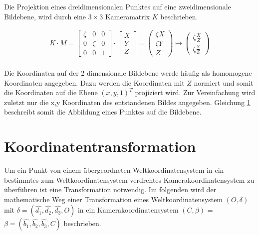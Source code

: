 Die Projektion eines dreidimensionalen Punktes auf eine zweidimensionale Bildebene, wird durch eine $3 \times 3$ Kameramatrix $K$ beschrieben. 

\begin{gather}
K\cdot M =
\begin{bmatrix}
\zeta&0&0\\
0&\zeta&0\\
0&0&1
\end{bmatrix}
\cdot
\begin{bmatrix}
X\\Y\\Z
\end{bmatrix}
=
\begin{pmatrix}
\zeta X\\ \zeta Y\\ Z
\end{pmatrix}
\mapsto
\begin{pmatrix}
\zeta \frac{X}{Z}\\ \zeta \frac{Y}{Z}
\end{pmatrix}
	\label{eq:21}
\end{gather}\\

Die Koordinaten auf der 2 dimensionale Bildebene werde häufig als homomogene Koordinaten angegeben. Dazu werden die Koordinaten mit $Z$ normiert und somit die Koordinaten auf die Ebene $(x,y,1)^T$ projiziert wird. Zur Vereinfachung wird zuletzt nur die x,y Koordinaten des entstandenen Bildes angegeben. Gleichung \ref{} beschreibt somit die Abbildung eines Punktes auf die Bildebene.

\section{Koordinatentransformation}

Um ein Punkt von einem übergeordneten Weltkoordinatensystem in ein bestimmtes zum Weltkoordinatensystem verdrehtes Kamerakoordinatensystem zu überführen ist eine Transformation notwendig. Im folgenden wird der mathematische Weg einer Transformation eines Weltkoordinatensystem $(O,\delta)$ mit $\delta = (\hat{d_1},\hat{d_2},\hat{d_3},O)$ in ein Kamerakoordinatensystem $(C,\beta)$ = $\beta = (\hat{b_1},\hat{b_2},\hat{b_3},C)$ beschrieben.



